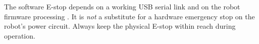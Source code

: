 \begin{warningbox}
  The software E-stop depends on a working USB serial link and on the
  robot firmware processing . It is \emph{not} a substitute for
  a hardware emergency stop on the robot's power circuit. Always keep the
  physical E-stop within reach during operation.
\end{warningbox}
